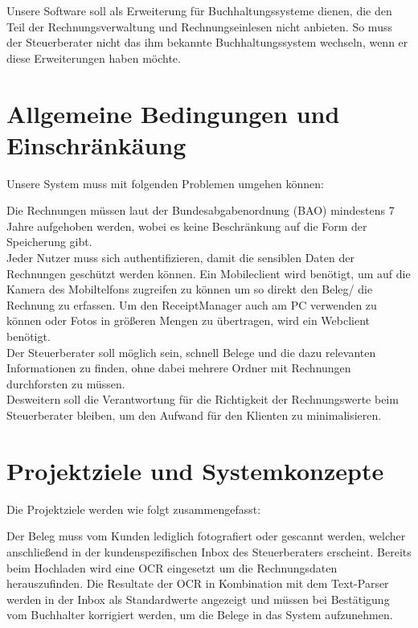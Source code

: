\documentclass[12pt]{article}
\theoremstyle{definition}
\begin{document}
	Unsere Software soll als Erweiterung für Buchhaltungssysteme dienen, die den Teil der Rechnungsverwaltung und Rechnungseinlesen nicht anbieten. So muss der Steuerberater nicht das ihm bekannte Buchhaltungssystem wechseln, wenn er diese Erweiterungen haben möchte.
\pagebreak

\section{Allgemeine Bedingungen und Einschränkäung}

Unsere System muss mit folgenden Problemen umgehen können:
\begin{itemize}
\end{itemize}
Die Rechnungen müssen laut der Bundesabgabenordnung (BAO) mindestens 7 Jahre aufgehoben werden, wobei es keine Beschränkung auf die Form der Speicherung gibt.\\

Jeder Nutzer muss sich authentifizieren, damit die sensiblen Daten der Rechnungen geschützt werden können.
Ein Mobileclient wird benötigt, um auf die Kamera des Mobiltelfons zugreifen zu können um so direkt den Beleg/ die Rechnung zu erfassen. Um den ReceiptManager auch am PC verwenden zu können oder Fotos in größeren Mengen zu übertragen, wird ein Webclient benötigt.\\

Der Steuerberater soll möglich sein, schnell Belege und die dazu relevanten Informationen zu finden, ohne dabei mehrere Ordner mit Rechnungen durchforsten zu müssen.\\

Desweitern soll die Verantwortung für die Richtigkeit der Rechnungswerte beim Steuerberater bleiben, um den Aufwand für den Klienten zu minimalisieren.


\pagebreak

\section{Projektziele und Systemkonzepte}
Die Projektziele werden wie folgt zusammengefasst:
\begin{itemize}
\end{itemize}
Der Beleg muss vom Kunden lediglich fotografiert oder gescannt werden, welcher anschließend in der kundenspezifischen Inbox des Steuerberaters erscheint. Bereits beim Hochladen wird eine OCR eingesetzt um die Rechnungsdaten herauszufinden. Die Resultate der OCR in Kombination mit dem Text-Parser werden in der Inbox als Standardwerte angezeigt und müssen bei Bestätigung vom Buchhalter korrigiert werden, um die Belege in das System aufzunehmen.\\
\end{document}
